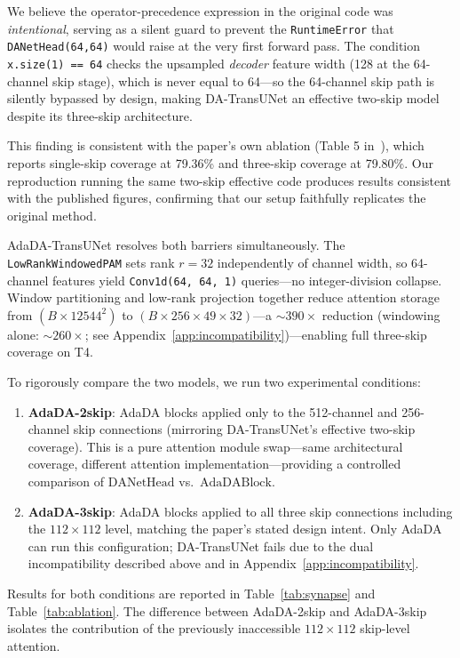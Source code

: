\documentclass[conference]{IEEEtran}
\begin{document}
We believe the operator-precedence expression in the original code was \emph{intentional}, serving as a silent guard to prevent the \texttt{RuntimeError} that \texttt{DANetHead(64,64)} would raise at the very first forward pass. The condition \texttt{x.size(1) == 64} checks the upsampled \emph{decoder} feature width (128 at the 64-channel skip stage), which is never equal to 64---so the 64-channel skip path is silently bypassed by design, making DA-TransUNet an effective two-skip model despite its three-skip architecture.

This finding is consistent with the paper's own ablation (Table 5 in~\cite{sun2024datransunet}), which reports single-skip coverage at 79.36\% and three-skip coverage at 79.80\%. Our reproduction running the same two-skip effective code produces results consistent with the published figures, confirming that our setup faithfully replicates the original method.

AdaDA-TransUNet resolves both barriers simultaneously. The \texttt{LowRankWindowedPAM} sets rank $r{=}32$ independently of channel width, so 64-channel features yield \texttt{Conv1d(64,\,64,\,1)} queries---no integer-division collapse. Window partitioning and low-rank projection together reduce attention storage from $(B{\times}12544^2)$ to $(B{\times}256{\times}49{\times}32)$---a ${\sim}390{\times}$ reduction (windowing alone: ${\sim}260{\times}$; see Appendix~\ref{app:incompatibility})---enabling full three-skip coverage on T4.

To rigorously compare the two models, we run two experimental conditions:

\begin{enumerate}
  \item \textbf{AdaDA-2skip}: AdaDA blocks applied only to the 512-channel and 256-channel skip connections (mirroring DA-TransUNet's effective two-skip coverage). This is a pure attention module swap---same architectural coverage, different attention implementation---providing a controlled comparison of $\text{DANetHead}$ vs.\ $\text{AdaDABlock}$.
  \item \textbf{AdaDA-3skip}: AdaDA blocks applied to all three skip connections including the $112{\times}112$ level, matching the paper's stated design intent. Only AdaDA can run this configuration; DA-TransUNet fails due to the dual incompatibility described above and in Appendix~\ref{app:incompatibility}.
\end{enumerate}

Results for both conditions are reported in Table~\ref{tab:synapse} and Table~\ref{tab:ablation}. The difference between AdaDA-2skip and AdaDA-3skip isolates the contribution of the previously inaccessible $112{\times}112$ skip-level attention.
\end{document}
